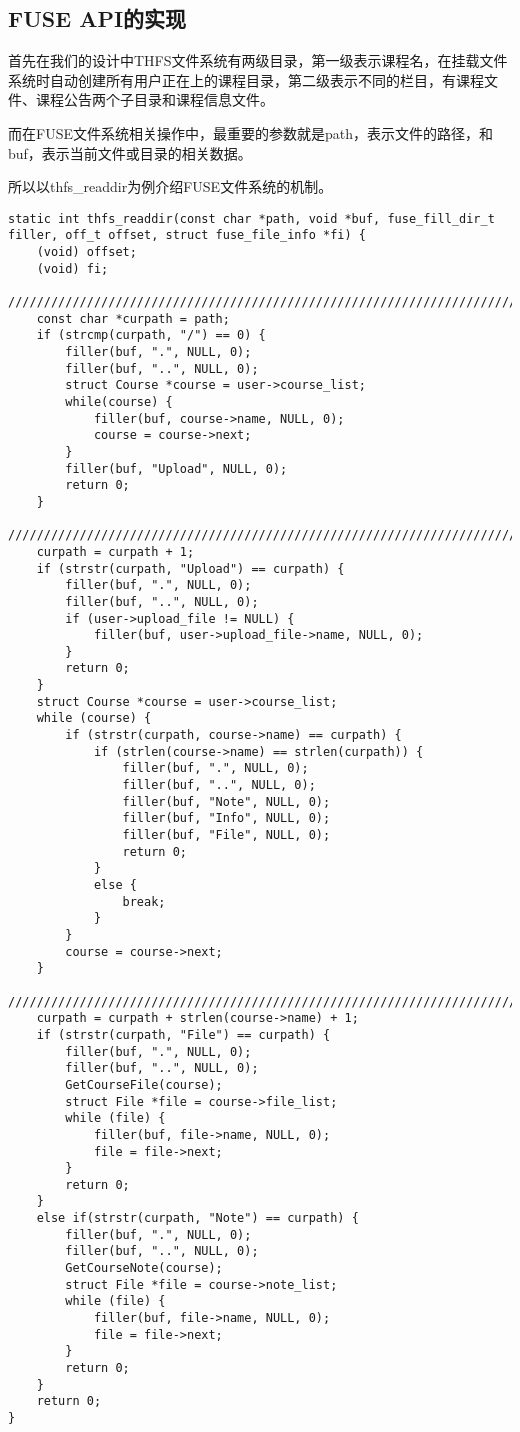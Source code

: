 \subsection{FUSE API的实现}
首先在我们的设计中THFS文件系统有两级目录，第一级表示课程名，在挂载文件系统时自动创建所有用户正在上的课程目录，第二级表示不同的栏目，有课程文件、课程公告两个子目录和课程信息文件。

而在FUSE文件系统相关操作中，最重要的参数就是path，表示文件的路径，和buf，表示当前文件或目录的相关数据。

所以以thfs\_readdir为例介绍FUSE文件系统的机制。

\begin{lstlisting}
static int thfs_readdir(const char *path, void *buf, fuse_fill_dir_t filler, off_t offset, struct fuse_file_info *fi) {
    (void) offset;
    (void) fi;
    //////////////////////////////////////////////////////////////////////////////////////////////
    const char *curpath = path;
    if (strcmp(curpath, "/") == 0) {
        filler(buf, ".", NULL, 0);
        filler(buf, "..", NULL, 0);
        struct Course *course = user->course_list;
        while(course) {
            filler(buf, course->name, NULL, 0);
            course = course->next;
        }
        filler(buf, "Upload", NULL, 0);
        return 0;
    }
    //////////////////////////////////////////////////////////////////////////////////////////////
    curpath = curpath + 1;
    if (strstr(curpath, "Upload") == curpath) {
        filler(buf, ".", NULL, 0);
        filler(buf, "..", NULL, 0);
        if (user->upload_file != NULL) {
            filler(buf, user->upload_file->name, NULL, 0);
        }
        return 0;
    }
    struct Course *course = user->course_list;
    while (course) {
        if (strstr(curpath, course->name) == curpath) {
            if (strlen(course->name) == strlen(curpath)) {
                filler(buf, ".", NULL, 0);
                filler(buf, "..", NULL, 0);
                filler(buf, "Note", NULL, 0);
                filler(buf, "Info", NULL, 0);
                filler(buf, "File", NULL, 0);
                return 0;
            }
            else {
                break;
            }
        }
        course = course->next;
    }
    //////////////////////////////////////////////////////////////////////////////////////////////
    curpath = curpath + strlen(course->name) + 1;
    if (strstr(curpath, "File") == curpath) {
        filler(buf, ".", NULL, 0);
        filler(buf, "..", NULL, 0);
        GetCourseFile(course);
        struct File *file = course->file_list;
        while (file) {
            filler(buf, file->name, NULL, 0);
            file = file->next;
        }
        return 0;
    }
    else if(strstr(curpath, "Note") == curpath) {
        filler(buf, ".", NULL, 0);
        filler(buf, "..", NULL, 0);
        GetCourseNote(course);
        struct File *file = course->note_list;
        while (file) {
            filler(buf, file->name, NULL, 0);
            file = file->next;
        }
        return 0;
    }
    return 0;
}
\end{lstlisting}

